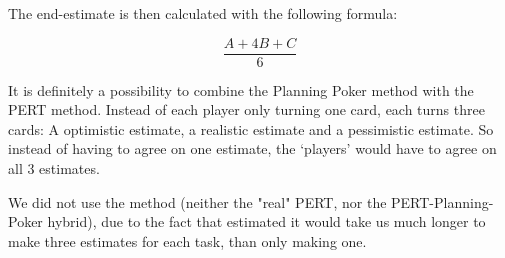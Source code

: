The end-estimate is then calculated with the  following formula:

\begin{equation}
	\frac{A+4B+C}{6}
\end{equation}

It is definitely a possibility to combine the Planning Poker method with the PERT method. Instead of each player only turning one card, each turns three cards: A optimistic estimate, a realistic estimate and a pessimistic estimate. So instead of having to agree on one estimate, the `players' would have to agree on all 3 estimates.

We did not use the method (neither the "real" PERT, nor the PERT-Planning-Poker hybrid), due to the fact that estimated it would take us much longer to make three estimates for each task, than only making one.